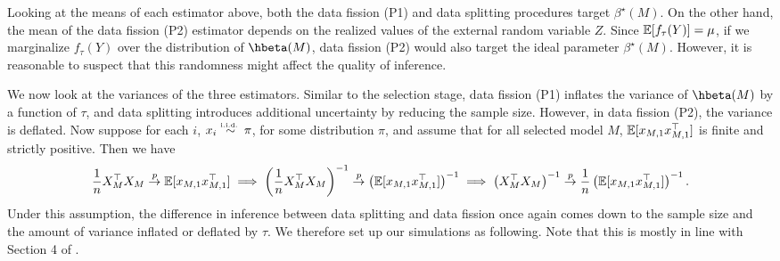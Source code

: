 Looking at the means of each estimator above, both the data fission (P1) and data splitting procedures target $\beta^\star(M)$. On the other hand, the mean of the data fission (P2) estimator depends on the realized values of the external random variable $Z$. Since $\mathbb{E}[f_\tau(Y)] = \mu$, if we marginalize $f_\tau(Y)$ over the distribution of $\hbeta(M)$, data fission (P2) would also target the ideal parameter $\beta^\star(M)$. However, it is reasonable to suspect that this randomness might affect the quality of inference.

We now look at the variances of the three estimators. Similar to the selection stage, data fission (P1) inflates the variance of $\hbeta(M)$ by a function of $\tau$, and data splitting introduces additional uncertainty by reducing the sample size. However, in data fission (P2), the variance is deflated. Now suppose for each $i$, $x_i \overset{\textrm{\tiny i.i.d.\ }}{\sim} \pi$, for some distribution $\pi$, and assume that for all selected model $M$, $\mathbb{E}[x_{M,1}x_{M,1}^\top]$ is finite and strictly positive. Then we have
\[
\frac{1}{n}X_M^\top X_M \overset{p}{\to} \mathbb{E}[x_{M,1}x_{M,1}^\top] \implies \left(\frac{1}{n}X_M^\top X_M\right)^{-1} \overset{p}{\to} \left( \mathbb{E}[x_{M,1}x_{M,1}^\top] \right)^{-1} \implies \left(X_M^\top X_M\right)^{-1} \overset{p}{\to} \frac{1}{n}\left( \mathbb{E}[x_{M,1}x_{M,1}^\top] \right)^{-1}.
\]
Under this assumption, the difference in inference between data splitting and data fission once again comes down to the sample size and the amount of variance inflated or deflated by $\tau$. We therefore set up our simulations as following. Note that this is mostly in line with Section 4 of \cite{leiner2022data}.

